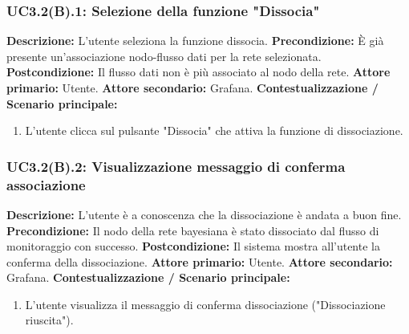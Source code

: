                 \subsubsection{UC3.2(B).1: Selezione della funzione "Dissocia"}
                    \textbf{Descrizione:} L’utente seleziona la funzione dissocia.
                    \newline
                    \textbf{Precondizione:}  \`E già presente un'associazione nodo-flusso dati per la rete selezionata.
                    \newline
                    \textbf{Postcondizione:} Il flusso dati non è più associato al nodo della rete.
                    \newline
                    \textbf{Attore primario:} Utente.
                    \newline
                    \textbf{Attore secondario:} Grafana.
                    \newline
                    \textbf{Contestualizzazione / Scenario principale:} \begin{enumerate}
                        \item L’utente clicca sul pulsante "Dissocia" che attiva la funzione di dissociazione.
                    \end{enumerate} 
	           
	                
	            \subsubsection{UC3.2(B).2: Visualizzazione messaggio di conferma associazione}
	                \textbf{Descrizione:} L’utente è a conoscenza che la dissociazione è andata a buon fine.
	                \newline
                    \textbf{Precondizione:} Il nodo della rete bayesiana è stato dissociato dal flusso di monitoraggio con successo.
                    \newline
                    \textbf{Postcondizione:} Il sistema mostra all'utente la conferma della dissociazione.
                    \newline
                    \textbf{Attore primario:} Utente.
                    \newline
                    \textbf{Attore secondario:} Grafana.
                    \newline
                    \textbf{Contestualizzazione / Scenario principale:} \begin{enumerate}
                        \item L'utente visualizza il messaggio di conferma dissociazione ("Dissociazione riuscita").
                    \end{enumerate}
                    
